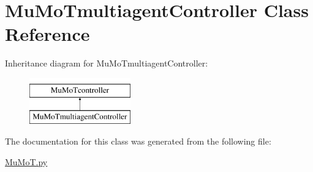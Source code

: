 \hypertarget{class_mu_mo_t_1_1_mu_mo_tmultiagent_controller}{}\section{Mu\+Mo\+Tmultiagent\+Controller Class Reference}
\label{class_mu_mo_t_1_1_mu_mo_tmultiagent_controller}
Inheritance diagram for Mu\+Mo\+Tmultiagent\+Controller\+:\begin{figure}[H]
\begin{center}
\leavevmode
\includegraphics[height=2.000000cm]{class_mu_mo_t_1_1_mu_mo_tmultiagent_controller}
\end{center}
\end{figure}


The documentation for this class was generated from the following file\+:\begin{DoxyCompactItemize}
\item 
\hyperlink{_mu_mo_t_8py}{Mu\+Mo\+T.\+py}\end{DoxyCompactItemize}
